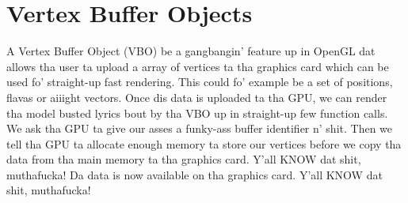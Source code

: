\section{Vertex Buffer Objects}
\label{sec:opengl_vbo}
A Vertex Buffer Object (VBO) be a gangbangin' feature up in OpenGL dat allows tha user ta upload a array of vertices ta tha graphics card which can be used fo' straight-up fast rendering. This could fo' example be a set of positions, flavas or aiiight vectors. Once dis data is uploaded ta tha GPU, we can render tha model busted lyrics bout by tha VBO up in straight-up few function calls. We ask tha GPU ta give our asses a funky-ass buffer identifier n' shit. Then we tell tha GPU ta allocate enough memory ta store our vertices before we copy tha data from tha main memory ta tha graphics card. Y'all KNOW dat shit, muthafucka! Da data is now available on tha graphics card. Y'all KNOW dat shit, muthafucka! 